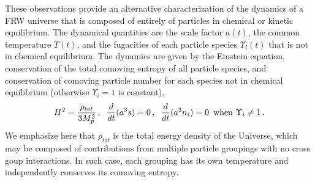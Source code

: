 These observations provide an alternative characterization of the dynamics of a FRW universe that is composed of entirely of particles in chemical or kinetic equilibrium.  The dynamical quantities are the scale factor $a(t)$, the common temperature $T(t)$, and the fugacities of each particle species $\Upsilon_i(t)$ that is not in chemical equilibrium.  The dynamics are given by the Einstein equation, conservation of the total comoving entropy of all particle species, and conservation of comoving particle number for each species not in chemical equilibrium (otherwise $\Upsilon_i=1$ is constant),
\begin{equation}\label{eq_dynamics}
H^2=\frac{\rho_{tot}}{3M_p^2}\,, \hspace{2mm} \frac{d}{dt}(a^3s)=0\,,\hspace{2mm} \frac{d}{dt}(a^3n_i)=0 \,\text{ when } \Upsilon_i\neq 1\,.
\end{equation}
We emphasize here that $\rho_{tot}$ is the total energy density of the Universe, which may be composed of contributions from multiple particle groupings with no cross goup interactions. In such case, each grouping has its own temperature and   independently conserves its comoving entropy. 



